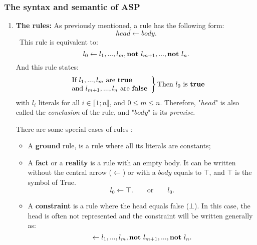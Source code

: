 \subsubsection{The syntax and semantic of ASP}
\label{sectionSyntaxeASP}
\begin{enumerate}

\item \textbf{The rules:}
As previously mentioned, a rule has the following form:
\texttt{
\begin{equation} \label{eq1ASP}
 head \leftarrow body.
\end{equation}
}
This rule is equivalent to:
\begin{equation} \label{eq2ASP}
l_{0} \leftarrow l_{1},...,l_{m}, \textbf{not}~ l_{m+1},..., \textbf{not}~ l_{n}.
\end{equation}
And this rule states:
\[
\left.
    \begin{array}{ll}
        \text{If} ~ l_{1},...,l_{m}  ~ \text{are \textbf{true}}\\
        \text{and} ~ l_{m+1},...,l_{n} ~ \text{are \textbf{false}}
    \end{array}
\right \} \text{Then} ~ l_{0} ~ \text{is } \textbf{true} 
\]
with $l_{i}$ literals for all $i \in \llbracket 1 ; n \rrbracket$, and $0 \leq m \leq n$.
Therefore, "$head$" is also called the \emph{conclusion} of the rule,
and "$body$" is its \emph{premise}.

There are some special cases of rules \cite{Vladimir,baral2003knowledge}:
\begin{itemize}
\item A  \textbf{ground} rule, is a rule  where all its literals are constants;
\item A \textbf{fact} or a \textbf{reality} is a rule with an empty body.
  It can be written without the central arrow ($\leftarrow$) or with a $body$ equals to $\top$, and $\top$  is the symbol of True.
\begin{equation} 
l_{0} \leftarrow \top. \qquad \text{or} \qquad l_{0}.
 \label{eq5ASP}
\end{equation}


\item A \textbf{constraint} is a rule where the head equals false ($\bot$).
  In this case, the head is often not represented and the constraint will be written generally as:
\begin{equation} 
  \leftarrow l_{1},...,l_{m}, \textbf{not}~ l_{m+1},..., \textbf{not}~ l_{n}.
  \label{eq6ASP}
\end{equation}


\end{itemize}
\end{enumerate}
